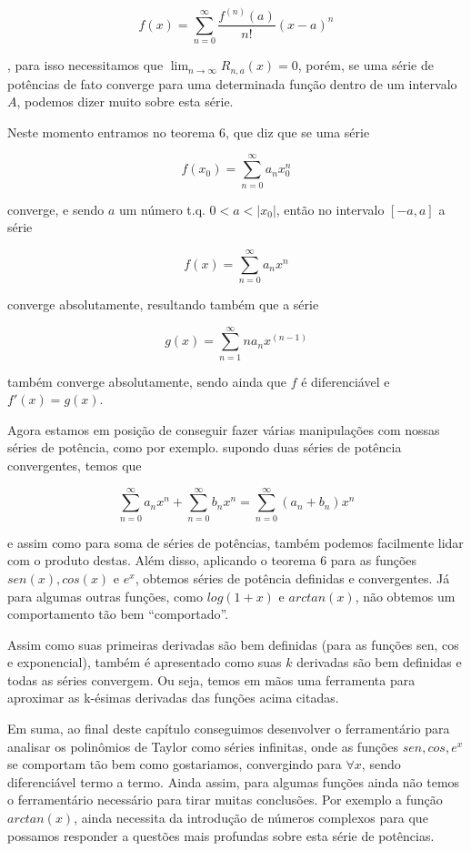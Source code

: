 \documentclass[a4paper, 12pt]{article}
\begin{document}
\begin{equation}
	\nonumber f(x) = \sum_{n=0}^\infty \frac{f^{(n)}(a)}{n!}(x-a)^n
\end{equation}

, para isso necessitamos que $\lim_{n\to\infty}R_{n,a}(x) = 0$,
porém, se uma série de potências de fato converge para uma determinada função dentro de um intervalo
$A$, podemos dizer muito sobre esta série.

Neste momento entramos no teorema 6, que diz que se uma série

\begin{equation}
	\nonumber f(x_0) = \sum_{n=0}^\infty a_n x_0^n
\end{equation}

converge, e sendo $a$ um número t.q. $0 < a < |x_0|$, então no intervalo $[-a,a]$ a série

\begin{equation}
	\nonumber f(x) = \sum_{n=0}^\infty a_n x^n
\end{equation}

converge absolutamente, resultando também que a série

\begin{equation}
	\nonumber g(x) = \sum_{n=1}^\infty n a_n x^{(n - 1)}
\end{equation}

também converge absolutamente, sendo ainda que $f$ é diferenciável e $f'(x) = g(x)$.

Agora estamos em posição de conseguir fazer várias manipulações com nossas séries de potência, como por exemplo.
supondo duas séries de potência convergentes, temos que 

\begin{equation}
	\nonumber \sum_{n=0}^\infty a_n x^n + \sum_{n=0}^\infty b_n x^n  = \sum_{n=0}^\infty (a_n + b_n) x^n 
\end{equation}

e assim como para soma de séries de potências, também podemos facilmente lidar com o produto destas.
Além disso, aplicando o teorema 6 para as funções $sen(x), cos(x)$ e  $e^x$, obtemos séries
de potência definidas e convergentes. Já para algumas outras funções, como $log(1+x)$ e $arctan(x)$, não
obtemos um comportamento tão bem ``comportado''. 

Assim como suas primeiras derivadas são bem definidas (para as funções sen, cos e exponencial),
também é apresentado como suas $k$ derivadas são bem definidas e todas as séries convergem.
Ou seja, temos em mãos uma ferramenta para aproximar as k-ésimas derivadas das funções acima
citadas.

Em suma, ao final deste capítulo conseguimos desenvolver o ferramentário para analisar os 
polinômios de Taylor como séries infinitas, onde as funções $sen,cos,e^x$  se comportam
tão bem como gostariamos, convergindo para $\forall x$, sendo diferenciável termo a termo.
Ainda assim, para algumas funções ainda não temos o ferramentário necessário para tirar 
muitas conclusões. Por exemplo a função $arctan(x)$, ainda necessita da introdução de números 
complexos para que possamos responder a questões mais profundas sobre esta série de potências.



\newpage
\end{document}
